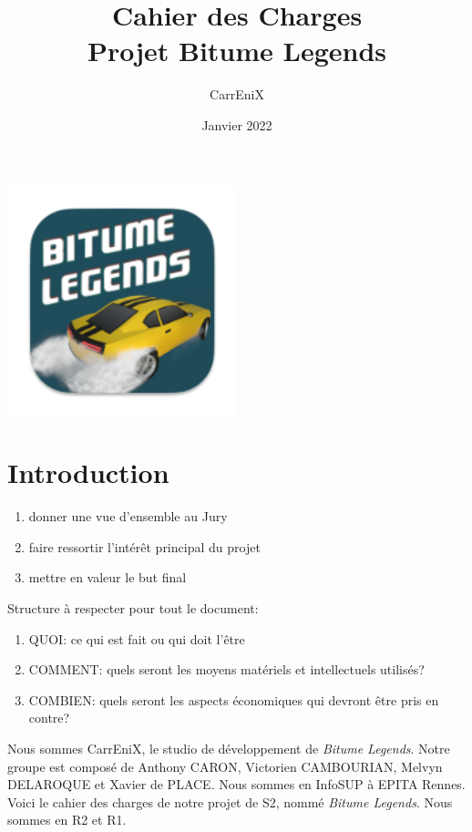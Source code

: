\documentclass[11pt,a4paper]{article}
\newcommand{\btmlgs}{\textit{Bitume Legends}}
\begin{document}
\title{Cahier des Charges \\ {\large Projet Bitume Legends}}
\author{CarrEniX}
\date{Janvier 2022}
\maketitle

\begin{center}
  \includegraphics[width=0.5\textwidth]{Medias/logo192.png}
\end{center}

\tableofcontents
\clearpage

\section{Introduction}
  \begin{enumerate}
    \item donner une vue d'ensemble au Jury
    \item faire ressortir l'intérêt principal du projet
    \item mettre en valeur le but final
  \end{enumerate}
  Structure à respecter pour tout le document:
  \begin{enumerate}
    \item QUOI: ce qui est fait ou qui doit l'être
    \item COMMENT: quels seront les moyens matériels et intellectuels utilisés?
    \item COMBIEN: quels seront les aspects économiques qui devront être pris en contre?
  \end{enumerate}
  Nous sommes CarrEniX, le studio de développement de \btmlgs. Notre groupe est composé de 
  Anthony CARON, Victorien CAMBOURIAN, Melvyn DELAROQUE et Xavier de PLACE. Nous sommes en InfoSUP à EPITA
  Rennes. Voici le cahier des charges de notre projet de S2, nommé \btmlgs. Nous sommes en R2 et R1.
  
\end{document}
